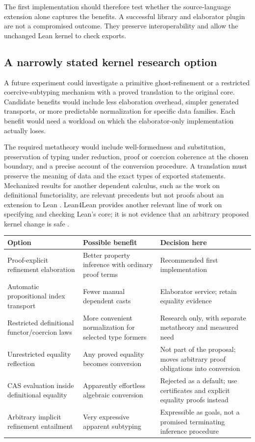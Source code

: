 \documentclass[11pt,a4paper]{article}
\theoremstyle{definition}
\theoremstyle{remark}
\begin{document}
The first implementation should therefore test whether the source-language extension alone captures the benefits. A successful library and elaborator plugin are not a compromised outcome. They preserve interoperability and allow the unchanged Lean kernel to check exports.

\subsection{A narrowly stated kernel research option}
A future experiment could investigate a primitive ghost-refinement or a restricted coercive-subtyping mechanism with a proved translation to the original core. Candidate benefits would include less elaboration overhead, simpler generated transports, or more predictable normalization for specific data families. Each benefit would need a workload on which the elaborator-only implementation actually loses.

The required metatheory would include well-formedness and substitution, preservation of typing under reduction, proof or coercion coherence at the chosen boundary, and a precise account of the conversion procedure. A translation must preserve the meaning of data and the exact types of exported statements. Mechanized results for another dependent calculus, such as the work on definitional functoriality, are relevant precedents but not proofs about an extension to Lean \cite{functoriality}. Lean4Lean provides another relevant line of work on specifying and checking Lean's core; it is not evidence that an arbitrary proposed kernel change is safe \cite{lean4lean}.

\begin{center}
\small
\begin{tabularx}{\textwidth}{@{}L{39mm}YY@{}}
\toprule
Option & Possible benefit & Decision here\\
\midrule
Proof-explicit refinement elaboration & Better property inference with ordinary proof terms & Recommended first implementation\\
Automatic propositional index transport & Fewer manual dependent casts & Elaborator service; retain equality evidence\\
Restricted definitional functor/coercion laws & More convenient normalization for selected type formers & Research only, with separate metatheory and measured need\\
Unrestricted equality reflection & Any proved equality becomes conversion & Not part of the proposal; moves arbitrary proof obligations into conversion\\
CAS evaluation inside definitional equality & Apparently effortless algebraic conversion & Rejected as a default; use certificates and explicit equality proofs instead\\
Arbitrary implicit refinement entailment & Very expressive apparent subtyping & Expressible as goals, not a promised terminating inference procedure\\
\bottomrule
\end{tabularx}
\end{center}
\end{document}
